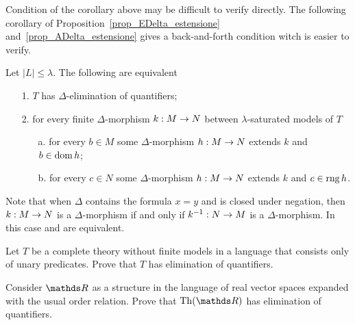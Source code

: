 Condition  of the corollary above may be difficult to verify directly. The following corollary of Proposition~\ref{prop_EDelta_estensione} and~\ref{prop_ADelta_estensione} gives a back-and-forth condition witch is easier to verify.

\begin{corollary}\label{corol_QE_back_and_forth}
Let $|L|\le\lambda$. The following are equivalent
\begin{itemize}
\item[1.] $T$ has $\Delta$-elimination of quantifiers;
\item[2.] for every finite $\Delta$-morphism $k:M\rightarrow N$ between $\lambda$-saturated models of $T$
\begin{itemize}                                                                                               \item[a.] for every $b\in M$ some $\Delta$-morphism $h:M\rightarrow N$ extends $k$ and $b\in\mathop{\rm dom} h$;                                                                                \item[b.] for every $c\in N$ some $\Delta$-morphism $h:M\rightarrow N$ extends $k$ and $c\in\mathop{\rm rng} h$.\noindent\nolinebreak[4]\hfill\rlap{\ \ $\Box$}                                                                   \end{itemize}
\end{itemize}
\end{corollary}

Note that when $\Delta$ contains the formula $x=y$ and is closed under negation, then  $k:M\rightarrow N$ is a $\Delta$-morphism if and only if $k^{-1}:N\rightarrow M$ is a $\Delta$-morphism. In this case  and  are equivalent.

\begin{exercise}
Let $T$ be a complete theory without finite models in a language that consists only of unary predicates. Prove that $T$ has elimination of quantifiers.\QED
\end{exercise}

\begin{exercise}
Consider $\RR$ as a structure in the language of real vector spaces expanded with the usual order relation. Prove that $\Th(\RR)$ has elimination of quantifiers.\QED
\end{exercise}

